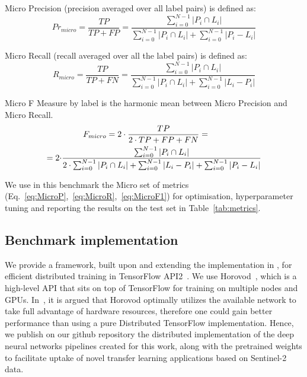 \documentclass[journal]{IEEEtran}
\begin{document}
Micro Precision (precision averaged over all label pairs) is defined as:
\begin{equation}
\label{eq:MicroP}
Pr_{micro}=\frac{T P}{T P+F P}=\frac{\sum_{i=0}^{N-1}\left|P_{i} \cap L_{i}\right|}{\sum_{i=0}^{N-1}\left|P_{i} \cap L_{i}\right|+\sum_{i=0}^{N-1}\left|P_{i}-L_{i}\right|}
\end{equation}


Micro Recall (recall averaged over all the label pairs) is defined as:
\begin{equation}
 \label{eq:MicroR}
R_{micro}=\frac{T P}{T P+F N}=\frac{\sum_{i=0}^{N-1}\left|P_{i} \cap L_{i}\right|}{\sum_{i=0}^{N-1}\left|P_{i} \cap L_{i}\right|+\sum_{i=0}^{N-1}\left|L_{i}-P_{i}\right|}
\end{equation}

Micro F Measure by label is the harmonic mean between Micro Precision and Micro Recall.
\begin{equation}
    \label{eq:MicroF1}
    \begin{aligned}[b]
    &\hspace{0.9cm}F_{micro} =  2\cdot \frac{T P}{2 \cdot T P+F P+F N}= \\=2\cdot
    & \frac{\sum_{i=0}^{N-1}\left|P_{i} \cap L_{i}\right|}{2 \cdot \sum_{i=0}^{N-1}\left|P_{i} \cap L_{i}\right|+\sum_{i=0}^{N-1}\left|L_{i}-P_{i}\right|+\sum_{i=0}^{N-1}\left|P_{i}-L_{i}\right|} 
    \end{aligned}
\end{equation}

We use in this benchmark the Micro set of metrics (Eq.~\ref{eq:MicroP},~\ref{eq:MicroR},~\ref{eq:MicroF1}) for optimisation, hyperparameter tuning and reporting the results on the test set in Table~\ref{tab:metrics}.

\subsection{Benchmark implementation}
\label{sec:distributed}

We provide a framework, built upon and extending the implementation in \cite{sumbul2020bigearthnet}, for efficient distributed training in TensorFlow API2~\citep{199317}. 
We use Horovod~\citep{sergeev2018horovod}, which is a high-level API that sits on top of TensorFlow for training on multiple nodes and GPUs. In~\cite{sergeev2018horovod}, it is argued that Horovod optimally utilizes the available network to take full advantage of hardware  resources, therefore one could gain better performance than using a pure Distributed TensorFlow implementation. 
Hence, we publish on our github repository the distributed implementation of the deep neural networks pipelines created for this work, along with the pretrained weights to facilitate uptake of novel transfer learning applications based on Sentinel-2 data. 
\end{document}
